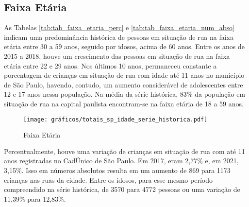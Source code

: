 \documentclass[14pt]{extarticle}
\begin{document}
\subsection{Faixa Etária}


As Tabelas \ref{tab:tab_faixa_etaria_perc} e \ref{tab:tab_faixa_etaria_num_abso} indicam uma predominância histórica de pessoas em situação de rua na faixa etária entre 30 a 59 anos, seguido por idosos, acima de 60 anos. Entre os anos de 2015 a 2018, houve um crescimento das pessoas em situação de rua na faixa etária entre 22 e 29 anos. Nos últimos 10 anos, permaneceu constante a porcentagem de crianças em situação de rua com idade até 11 anos no município de São Paulo, havendo, contudo, um aumento considerável de adolescentes entre 12 e 17 anos nessa população. Na média da série histórica, 83\% da população em situação de rua na capital paulista encontram-se na faixa etária de 18 a 59 anos.\\

%
\begin{figure}[H]
\centering
	\caption{Faixa Etária}
	\texttt{[image: gráficos/totais\_sp\_idade\_serie\_historica.pdf]}
	\label{fig:faixa_estaria}
\end{figure}
%

Percentualmente, houve uma variação de crianças em situação de rua com até 11 anos registradas no CadÚnico de São Paulo. Em 2017, eram 2,77\% e, em 2021, 3,15\%. Isso em números absolutos resulta em um aumento de 869 para 1173 crianças nas ruas da cidade. Entre os idosos, para esse mesmo período compreendido na série histórica, de 3570 para 4772 pessoas ou uma variação de 11,39\% para 12,83\%.\\
\end{document}
